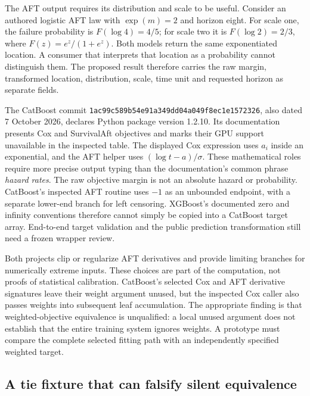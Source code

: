 The AFT output requires its distribution and scale to be useful. Consider an
authored logistic AFT law with $\exp(m)=2$ and horizon eight. For scale one,
the failure probability is $F(\log 4)=4/5$; for scale two it is
$F(\log 2)=2/3$, where $F(z)=e^z/(1+e^z)$. Both models return the same
exponentiated location. A consumer that interprets that location as a probability
cannot distinguish them. The proposed result therefore carries the raw margin,
transformed location, distribution, scale, time unit and requested horizon as
separate fields.~\citep{exec24_longcxx_reference}

The CatBoost commit
\texttt{1ac99c589b54e91a349dd04a049f8ec1e1572326}, also dated 7 October
2026, declares Python package version 1.2.10. Its documentation presents Cox
and SurvivalAft objectives and marks their GPU support unavailable in the
inspected table. The displayed Cox expression uses $a_i$ inside an exponential,
and the AFT helper uses $(\log t-a)/\sigma$. These mathematical roles require
more precise output typing than the documentation's common phrase \emph{hazard
rates}. The raw objective margin is not an absolute hazard or probability.
CatBoost's inspected AFT routine uses $-1$ as an unbounded endpoint, with a
separate lower-end branch for left censoring. XGBoost's documented zero and
infinity conventions therefore cannot simply be copied into a CatBoost target
array. End-to-end target validation and the public prediction transformation
still need a frozen wrapper review.~\citep{exec24_longcxx_catboost}

Both projects clip or regularize AFT derivatives and provide limiting branches
for numerically extreme inputs. These choices are part of the computation,
not proofs of statistical calibration. CatBoost's selected Cox and AFT derivative
signatures leave their weight argument unused, but the inspected Cox caller
also passes weights into subsequent leaf accumulation. The appropriate finding
is that weighted-objective equivalence is unqualified: a local unused argument
does not establish that the entire training system ignores weights. A prototype
must compare the complete selected fitting path with an independently specified
weighted target.~\citep{exec24_longcxx_xgboost,exec24_longcxx_catboost}

\subsection{A tie fixture that can falsify silent equivalence}


